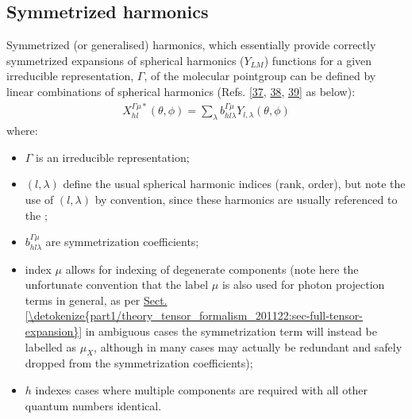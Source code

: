 \documentclass[letterpaper,table,10pt,english]{jupyterBook}
\begin{document}
\subsection{Symmetrized harmonics}
\label{\detokenize{part1/theory_observables_intro_211122:symmetrized-harmonics}}\label{\detokenize{part1/theory_observables_intro_211122:sec-theory-sym-harm-into}}
\sphinxAtStartPar
Symmetrized (or generalised) harmonics, which essentially provide correctly symmetrized expansions of spherical harmonics (\(Y_{LM}\)) functions for a given irreducible representation, \(\Gamma\), of the molecular point\sphinxhyphen{}group can be defined by linear combinations of spherical harmonics (Refs. {[}\hyperlink{cite.backmatter/bibliography:id421}{37}, \hyperlink{cite.backmatter/bibliography:id422}{38}, \hyperlink{cite.backmatter/bibliography:id459}{39}{]} as below):
\begin{equation}\label{equation:part1/theory_observables_intro_211122:eq:symHarm-defn}
\begin{split}
X_{hl}^{\Gamma\mu*}(\theta,\phi)=\sum_{\lambda}b_{hl\lambda}^{\Gamma\mu}Y_{l,\lambda}(\theta,\phi)
\end{split}
\end{equation}
\sphinxAtStartPar
where:
\begin{itemize}
\item {} 
\sphinxAtStartPar
\(\Gamma\) is an irreducible representation;

\item {} 
\sphinxAtStartPar
\((l, \lambda)\) define the usual spherical harmonic indices (rank, order), but note the use of \((l, \lambda)\) by convention, since these harmonics are usually referenced to the {\hyperref[\detokenize{backmatter/glossary:term-MF}]{}};

\item {} 
\sphinxAtStartPar
\(b_{hl\lambda}^{\Gamma\mu}\) are symmetrization coefficients;

\item {} 
\sphinxAtStartPar
index \(\mu\) allows for indexing of degenerate components (note here the unfortunate convention that the label \(\mu\) is also used for photon projection terms in general, as per \hyperref[\detokenize{part1/theory_tensor_formalism_201122:sec-full-tensor-expansion}]{Sect.\@ \ref{\detokenize{part1/theory_tensor_formalism_201122:sec-full-tensor-expansion}}} \sphinxhyphen{} in ambiguous cases the symmetrization term will instead be labelled as \(\mu_X\), although in many cases may actually be redundant and safely dropped from the symmetrization coefficients);

\item {} 
\sphinxAtStartPar
\(h\) indexes cases where multiple components are required with all other quantum numbers identical.

\end{itemize}
\end{document}
